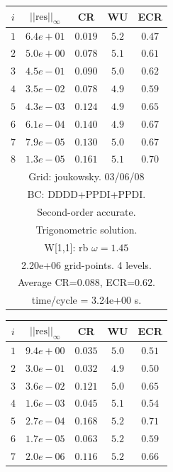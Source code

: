 \begin{table}[hbt]
\begin{center}
{\begin{tabular}{|c|c|c|c|c|}
\hline 
\end{tabular}
\begin{tabular}{|c|c|c|c|c|} \hline 
 $i$   & $\vert\vert\mbox{res}\vert\vert_\infty$  &  CR     &  WU    & ECR  \\   \hline 
 $ 1$  & $ 6.4e+01$ & $0.019$ & $ 5.2$ & $0.47$ \\ 
 $ 2$  & $ 5.0e+00$ & $0.078$ & $ 5.1$ & $0.61$ \\ 
 $ 3$  & $ 4.5e-01$ & $0.090$ & $ 5.0$ & $0.62$ \\ 
 $ 4$  & $ 3.5e-02$ & $0.078$ & $ 4.9$ & $0.59$ \\ 
 $ 5$  & $ 4.3e-03$ & $0.124$ & $ 4.9$ & $0.65$ \\ 
 $ 6$  & $ 6.1e-04$ & $0.140$ & $ 4.9$ & $0.67$ \\ 
 $ 7$  & $ 7.9e-05$ & $0.130$ & $ 5.0$ & $0.67$ \\ 
 $ 8$  & $ 1.3e-05$ & $0.161$ & $ 5.1$ & $0.70$ \\ 
\hline 
\multicolumn{5}{|c|}{Grid: joukowsky. 03/06/08}  \\
\multicolumn{5}{|c|}{BC: DDDD+PPDI+PPDI.}  \\
\multicolumn{5}{|c|}{Second-order accurate.}  \\
\multicolumn{5}{|c|}{Trigonometric solution.}  \\
\multicolumn{5}{|c|}{W[1,1]: rb $\omega=1.45$}  \\
\multicolumn{5}{|c|}{2.20e+06 grid-points. 4 levels.}  \\
\multicolumn{5}{|c|}{Average CR=$0.088$, ECR=$0.62$.}  \\
\multicolumn{5}{|c|}{time/cycle = 3.24e+00 s.}  \\
\hline 
\end{tabular}
\begin{tabular}{|c|c|c|c|c|} \hline 
 $i$   & $\vert\vert\mbox{res}\vert\vert_\infty$  &  CR     &  WU    & ECR  \\   \hline 
 $ 1$  & $ 9.4e+00$ & $0.035$ & $ 5.0$ & $0.51$ \\ 
 $ 2$  & $ 3.0e-01$ & $0.032$ & $ 4.9$ & $0.50$ \\ 
 $ 3$  & $ 3.6e-02$ & $0.121$ & $ 5.0$ & $0.65$ \\ 
 $ 4$  & $ 1.6e-03$ & $0.045$ & $ 5.1$ & $0.54$ \\ 
 $ 5$  & $ 2.7e-04$ & $0.168$ & $ 5.2$ & $0.71$ \\ 
 $ 6$  & $ 1.7e-05$ & $0.063$ & $ 5.2$ & $0.59$ \\ 
 $ 7$  & $ 2.0e-06$ & $0.116$ & $ 5.2$ & $0.66$ \\ 

\end{tabular}}
\end{center}
\end{table}
